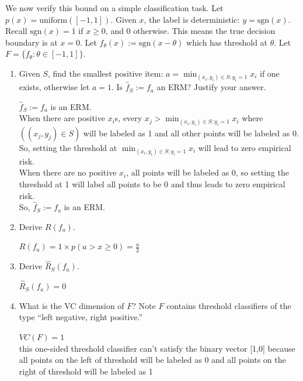 \documentclass[a4paper]{article}
\theoremstyle{definition}
\newcommand{\sgn}{\mathrm{sgn}}
\newenvironment{soln}{
    \leavevmode\color{blue}\ignorespaces
}{}
\begin{document}
We now verify this bound on a simple classification task.  Let $p(x)=\mathrm{uniform}([-1,1])$.  Given $x$, the label is deterministic: $y=\sgn(x)$.
Recall $\sgn(x)=1$ if $x\ge 0$, and 0 otherwise.
This means the true decision boundary is at $x=0$.
Let $f_\theta(x) := \sgn(x-\theta)$ which has threshold at $\theta$.
Let $F=\{f_\theta: \theta \in [-1,1]\}$.  
\begin{enumerate}
\item Given $S$, find the smallest positive item: $a = \min_{(x_i, y_i)\in S: y_i=1} x_i$ if one exists, otherwise let $a=1$.  Is $\hat f_S := f_a$ an ERM?  Justify your answer.

\begin{soln}
$\hat f_S := f_a$ is an ERM.\\
When there are positive $x_i$s, every $x_j > \min_{(x_i, y_i)\in S: y_i=1} x_i$ where $((x_j, y_j)\in S)$ will be labeled as 1 and all other points will be labeled as 0. So, setting the threshold at $ \min_{(x_i, y_i)\in S: y_i=1} x_i$ will lead to zero empirical risk.
\\When there are no positive $x_i$, all points will be labeled as 0, so setting the threshold at 1 will label all points to be 0 and thus leads to zero empirical risk.
\\ So, $\hat f_S := f_a$ is an ERM.
\end{soln}

\item Derive $R(f_a)$.

\begin{soln}
$R(f_a) = 1\times p( a > x \ge 0 ) = \frac {a} {2}$
\end{soln}

\item Derive $\hat R_S(f_a)$.

\begin{soln}
$\hat R_S(f_a) = 0$
\end{soln}

\item What is the VC dimension of $F$?  Note $F$ contains threshold classifiers of the type ``left negative, right positive.''

\begin{soln}
$VC(F) = 1$ \\
this one-sided threshold classifier can't satisfy the binary vector [1,0] because all points on the left of threshold will be labeled as 0 and all points on the right of threshold will be labeled as 1
\end{soln}
 

\end{enumerate}
\end{document}
